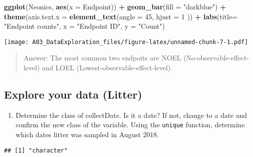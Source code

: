 \documentclass[
]{article}
\newenvironment{Shaded}{\begin{snugshade}}{\end{snugshade}}
\newcommand{\DataTypeTok}[1]{\textcolor[rgb]{0.13,0.29,0.53}{#1}}
\newcommand{\DecValTok}[1]{\textcolor[rgb]{0.00,0.00,0.81}{#1}}
\newcommand{\KeywordTok}[1]{\textcolor[rgb]{0.13,0.29,0.53}{\textbf{#1}}}
\newcommand{\NormalTok}[1]{#1}
\newcommand{\OperatorTok}[1]{\textcolor[rgb]{0.81,0.36,0.00}{\textbf{#1}}}
\newcommand{\StringTok}[1]{\textcolor[rgb]{0.31,0.60,0.02}{#1}}
\providecommand{\tightlist}{%
  \setlength{\itemsep}{0pt}\setlength{\parskip}{0pt}}
\begin{document}
\begin{Shaded}
\begin{Highlighting}[]
\KeywordTok{ggplot}\NormalTok{(Neonics, }\KeywordTok{aes}\NormalTok{(}\DataTypeTok{x =}\NormalTok{ Endpoint)) }\OperatorTok{+}
\StringTok{  }\KeywordTok{geom_bar}\NormalTok{(}\DataTypeTok{fill =} \StringTok{"darkblue"}\NormalTok{) }\OperatorTok{+}
\StringTok{  }\KeywordTok{theme}\NormalTok{(}\DataTypeTok{axis.text.x =} \KeywordTok{element_text}\NormalTok{(}\DataTypeTok{angle =} \DecValTok{45}\NormalTok{, }\DataTypeTok{hjust =} \DecValTok{1}\NormalTok{ )) }\OperatorTok{+}
\StringTok{  }\KeywordTok{labs}\NormalTok{(}\DataTypeTok{title=} \StringTok{"Endpoint counts"}\NormalTok{, }\DataTypeTok{x =} \StringTok{"Endpoint ID"}\NormalTok{, }\DataTypeTok{y =} \StringTok{"Count"}\NormalTok{) }
\end{Highlighting}
\end{Shaded}

\texttt{[image: A03\_DataExploration\_files/figure-latex/unnamed-chunk-7-1.pdf]}

\begin{quote}
Answer: The most common two endpoits are NOEL
(No-observable-effect-level) and LOEL (Lowest-observable-effect-level).
\end{quote}

\hypertarget{explore-your-data-litter}{%
\subsection{Explore your data (Litter)}\label{explore-your-data-litter}}

\begin{enumerate}
\def\labelenumi{\arabic{enumi}.}
\setcounter{enumi}{11}
\tightlist
\item
  Determine the class of collectDate. Is it a date? If not, change to a
  date and confirm the new class of the variable. Using the
  \texttt{unique} function, determine which dates litter was sampled in
  August 2018.
\end{enumerate}

\begin{Shaded}
\end{Shaded}

\begin{verbatim}
## [1] "character"
\end{verbatim}
\end{document}
